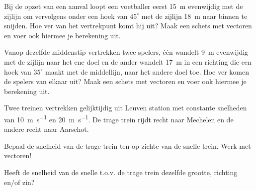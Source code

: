 \documentclass{ximera}
\begin{document}
	\author{Bart Lambregs en Vincent Gellens}
    \xmsource\xmuitleg



\begin{exercise}
Bij de opzet van een aanval loopt een voetballer eerst \SI{15}{\meter} evenwijdig met de zijlijn om vervolgens onder een hoek van \(45^\circ\) met de zijlijn \SI{18}{\meter} naar binnen te snijden. 
Hoe ver van het vertrekpunt komt hij uit? Maak een schets met vectoren en voer ook hiermee je berekening uit.
\end{exercise}

\begin{exercise}
Vanop dezelfde middenstip vertrekken twee spelers, één wandelt \SI{9}{\meter} evenwijdig met de zijlijn naar het ene doel en de ander wandelt \SI{17}{\meter} in een richting die een hoek van \(35^\circ\) maakt met de middellijn, naar het andere doel toe. 
Hoe ver komen de spelers van elkaar uit? Maak een schets met vectoren en voer ook hiermee je berekening uit.
\end{exercise}


\begin{exercise}
	Twee treinen vertrekken gelijktijdig uit Leuven station met constante snelheden van \SI{10}{\meter\per\second} en \SI{20}{\meter\per\second}.
	De trage trein rijdt recht naar Mechelen en de andere recht naar Aarschot. 
	
	\begin{image}[0.4\textwidth]
	\end{image}

	\begin{question}
		Bepaal de snelheid van de trage trein ten op zichte van de snelle trein. Werk met vectoren!
	\end{question}

	\begin{question}
		Heeft de snelheid van de snelle t.o.v. de trage trein dezelfde grootte, richting en/of zin?
	\end{question}
	\end{exercise}
\end{document}
